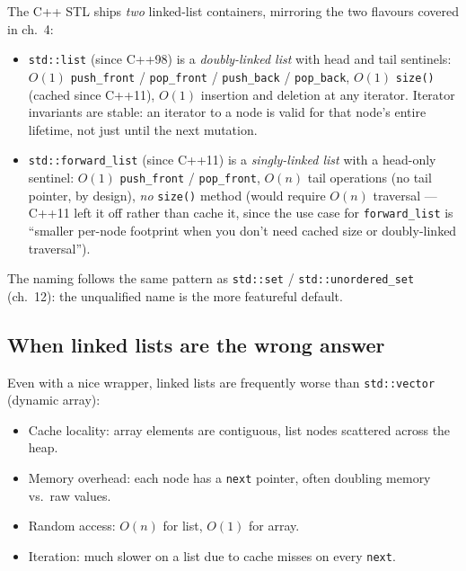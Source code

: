 \documentclass[11pt]{article}
\begin{document}
\begin{notebox}
The C++ STL ships \emph{two} linked-list containers, mirroring the
two flavours covered in ch.~4:
\begin{itemize}[leftmargin=*]
    \item \texttt{std::list} (since C++98) is a \emph{doubly-linked
          list} with head and tail sentinels: $O(1)$
          \texttt{push\_front} / \texttt{pop\_front} /
          \texttt{push\_back} / \texttt{pop\_back}, $O(1)$
          \texttt{size()} (cached since C++11), $O(1)$ insertion
          and deletion at any iterator. Iterator invariants are
          stable: an iterator to a node is valid for that node's
          entire lifetime, not just until the next mutation.
    \item \texttt{std::forward\_list} (since C++11) is a
          \emph{singly-linked list} with a head-only sentinel:
          $O(1)$ \texttt{push\_front} / \texttt{pop\_front},
          $O(n)$ tail operations (no tail pointer, by design),
          \emph{no} \texttt{size()} method (would require $O(n)$
          traversal --- C++11 left it off rather than cache it,
          since the use case for \texttt{forward\_list} is
          ``smaller per-node footprint when you don't need cached
          size or doubly-linked traversal'').
\end{itemize}
The naming follows the same pattern as
\texttt{std::set} / \texttt{std::unordered\_set} (ch.~12): the
unqualified name is the more featureful default.
\end{notebox}

\subsection*{When linked lists are the wrong answer}

Even with a nice wrapper, linked lists are frequently worse than \texttt{std::vector} (dynamic array):

\begin{itemize}[leftmargin=*]
    \item Cache locality: array elements are contiguous, list nodes scattered across the heap.
    \item Memory overhead: each node has a \texttt{next} pointer, often doubling memory vs.\ raw values.
    \item Random access: $O(n)$ for list, $O(1)$ for array.
    \item Iteration: much slower on a list due to cache misses on every \texttt{next}.
\end{itemize}
\end{document}
